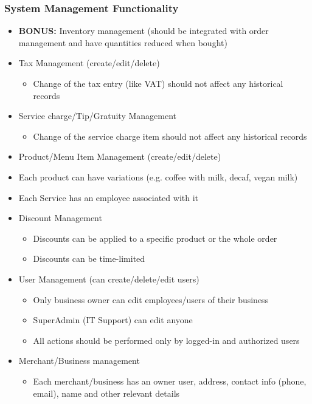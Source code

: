 \documentclass[]{VUMIFTemplateClass}
\begin{document}
\subsubsection*{System Management Functionality}

\begin{itemize}
    \item \textbf{BONUS:} Inventory management (should be integrated with order management and have quantities reduced when bought)
    \item Tax Management (create/edit/delete)
    \begin{itemize}
        \item Change of the tax entry (like VAT) should not affect any historical records
    \end{itemize}
    \item Service charge/Tip/Gratuity Management
    \begin{itemize}
        \item Change of the service charge item should not affect any historical records
    \end{itemize}
    \item Product/Menu Item Management (create/edit/delete)
    \item Each product can have variations (e.g. coffee with milk, decaf, vegan milk)
    \item Each Service has an employee associated with it
    \item Discount Management
    \begin{itemize}
        \item Discounts can be applied to a specific product or the whole order
        \item Discounts can be time-limited
    \end{itemize}
    \item User Management (can create/delete/edit users)
    \begin{itemize}
        \item Only business owner can edit employees/users of their business
        \item SuperAdmin (IT Support) can edit anyone
        \item All actions should be performed only by logged-in and authorized users
    \end{itemize}
    \item Merchant/Business management
    \begin{itemize}
        \item Each merchant/business has an owner user, address, contact info (phone, email), name and other relevant details
    \end{itemize}
\end{itemize}
\end{document}
